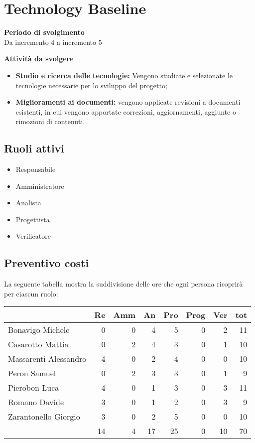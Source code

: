 \section{Technology Baseline}

\textbf{Periodo di svolgimento}
\\ Da incremento 4 a incremento 5

\textbf{Attività da svolgere}
    \begin{itemize}
        \item \textbf{Studio e ricerca delle tecnologie:} Vengono studiate e selezionate le tecnologie necessarie per lo sviluppo del progetto; 
        \item \textbf{Miglioramenti ai documenti:} vengono applicate revisioni a documenti esistenti, in cui vengono apportate correzioni, aggiornamenti, aggiunte o rimozioni di contenuti.
    \end{itemize}

\subsection{Ruoli attivi}
\begin{itemize}
    \item Responsabile
    \item Amministratore 
    \item Analista 
    \item Progettista 
    \item Verificatore 
\end{itemize}

\subsection{Preventivo costi}

La seguente tabella mostra la suddivisione delle ore che ogni persona ricoprirà per ciascun ruolo:

\begin{table}[H]
    \begin{tabularx}{\linewidth}{X|rrrrrrr}
    \rowcolor{gray!30}& Re & Amm & An & Pro & Prog & Ver & tot \\
    \hline
    Bonavigo Michele                        & 0 & 0 & 4 & 5 & 0 & 2 & 11 \\
    \rowcolor{gray!10}Casarotto Mattia      & 0 & 2 & 4 & 3 & 0 & 1 & 10 \\
    Massarenti Alessandro                   & 4 & 0 & 2 & 4 & 0 & 0 & 10 \\
    \rowcolor{gray!10}Peron Samuel          & 0 & 2 & 3 & 3 & 0 & 1 & 9 \\
    Pierobon Luca                           & 4 & 0 & 1 & 3 & 0 & 3 & 11 \\
    \rowcolor{gray!10}Romano Davide         & 3 & 0 & 1 & 2 & 0 & 3 & 9 \\
    Zarantonello Giorgio                    & 3 & 0 & 2 & 5 & 0 & 0 & 10 \\
    \hline                                  & 14 & 4 & 17 & 25 & 0 & 10 & 70 \\ 
    \end{tabularx}
\end{table}

